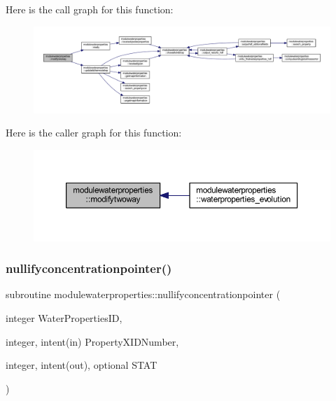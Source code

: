 Here is the call graph for this function\+:\nopagebreak
\begin{figure}[H]
\begin{center}
\leavevmode
\includegraphics[width=350pt]{namespacemodulewaterproperties_aa39cc64df05076f8396e1894e6e74ad5_cgraph}
\end{center}
\end{figure}
Here is the caller graph for this function\+:\nopagebreak
\begin{figure}[H]
\begin{center}
\leavevmode
\includegraphics[width=350pt]{namespacemodulewaterproperties_aa39cc64df05076f8396e1894e6e74ad5_icgraph}
\end{center}
\end{figure}
\mbox{\label{namespacemodulewaterproperties_aded20695e00a7e2a2792781914847187}} 
\subsubsection{\texorpdfstring{nullifyconcentrationpointer()}{nullifyconcentrationpointer()}}
{\footnotesize\ttfamily subroutine modulewaterproperties\+::nullifyconcentrationpointer (\begin{DoxyParamCaption}\item[{integer}]{Water\+Properties\+ID,  }\item[{integer, intent(in)}]{Property\+X\+I\+D\+Number,  }\item[{integer, intent(out), optional}]{S\+T\+AT }\end{DoxyParamCaption})\hspace{0.3cm}{\ttfamily [private]}}

